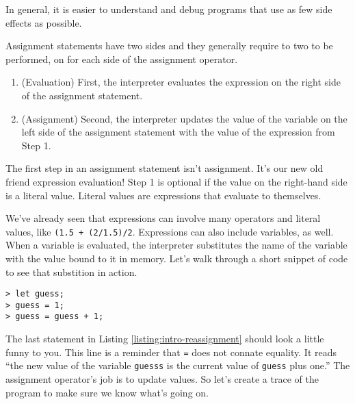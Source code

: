 \begin{center}
  In general, it is easier to understand and debug programs that use as few side effects as possible.
\end{center}

Assignment statements have two sides and they generally require to two to be performed, on for each side of the assignment operator.

\begin{enumerate}
  \item (Evaluation) First, the interpreter evaluates the expression on the right side of the assignment statement.
  \item (Assignment) Second, the interpreter updates the value of the variable on the left side of the assignment statement with the value of the expression from Step 1.
\end{enumerate}

The first step in an assignment statement isn't assignment. It's our new old friend expression evaluation! Step 1 is optional if the value on the right-hand side is a literal value. Literal values are expressions that evaluate to themselves.

We've already seen that expressions can involve many operators and literal values, like \texttt{(1.5 + (2/1.5)/2}. Expressions can also include variables, as well. When a variable is evaluated, the interpreter substitutes the name of the variable with the value bound to it in memory. Let's walk through a short snippet of code to see that substition in action.

\begin{lstlisting}[caption={\label{listing:intro-reassignment} Proof that assignment is not equality. The updating would be clearer if we had that arrow!  \texttt{guess} $\gets$ \texttt{guess + 1;}}]
> let guess;
> guess = 1;
> guess = guess + 1;
\end{lstlisting}

The last statement in Listing \ref{listing:intro-reassignment} should look a little funny to you. This line is a reminder that \texttt{=} does not connate equality. It reads ``the new value of the variable \texttt{guesss} is the current value of \texttt{guess} plus one.'' The assignment operator's job is to update values. So let's create a trace of the program to make sure we know what's going on.

